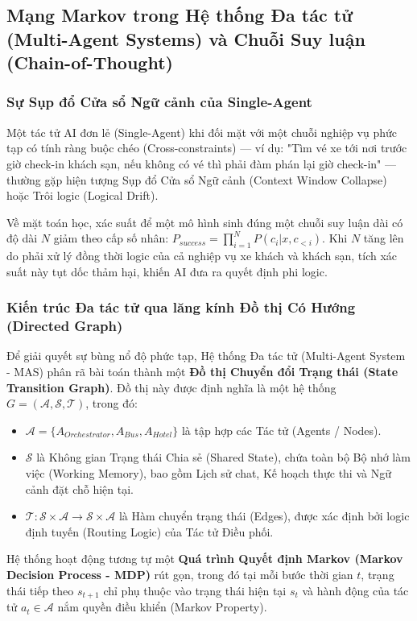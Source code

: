 \subsection{Mạng Markov trong Hệ thống Đa tác tử (Multi-Agent Systems) và Chuỗi Suy luận (Chain-of-Thought)}

\subsubsection{Sự Sụp đổ Cửa sổ Ngữ cảnh của Single-Agent}
Một tác tử AI đơn lẻ (Single-Agent) khi đối mặt với một chuỗi nghiệp vụ phức tạp có tính ràng buộc chéo (Cross-constraints) — ví dụ: "Tìm vé xe tới nơi trước giờ check-in khách sạn, nếu không có vé thì phải đàm phán lại giờ check-in" — thường gặp hiện tượng Sụp đổ Cửa sổ Ngữ cảnh (Context Window Collapse) hoặc Trôi logic (Logical Drift). 

Về mặt toán học, xác suất để một mô hình sinh đúng một chuỗi suy luận dài có độ dài $N$ giảm theo cấp số nhân: $P_{success} = \prod_{i=1}^{N} P(c_i | x, c_{<i})$. Khi $N$ tăng lên do phải xử lý đồng thời logic của cả nghiệp vụ xe khách và khách sạn, tích xác suất này tụt dốc thảm hại, khiến AI đưa ra quyết định phi logic.

\subsubsection{Kiến trúc Đa tác tử qua lăng kính Đồ thị Có Hướng (Directed Graph)}
Để giải quyết sự bùng nổ độ phức tạp, Hệ thống Đa tác tử (Multi-Agent System - MAS) phân rã bài toán thành một \textbf{Đồ thị Chuyển đổi Trạng thái (State Transition Graph)}. Đồ thị này được định nghĩa là một hệ thống $G = (\mathcal{A}, \mathcal{S}, \mathcal{T})$, trong đó:
\begin{itemize}
    \item $\mathcal{A} = \{A_{Orchestrator}, A_{Bus}, A_{Hotel}\}$ là tập hợp các Tác tử (Agents / Nodes).
    \item $\mathcal{S}$ là Không gian Trạng thái Chia sẻ (Shared State), chứa toàn bộ Bộ nhớ làm việc (Working Memory), bao gồm Lịch sử chat, Kế hoạch thực thi và Ngữ cảnh đặt chỗ hiện tại.
    \item $\mathcal{T}: \mathcal{S} \times \mathcal{A} \rightarrow \mathcal{S} \times \mathcal{A}$ là Hàm chuyển trạng thái (Edges), được xác định bởi logic định tuyến (Routing Logic) của Tác tử Điều phối.
\end{itemize}

Hệ thống hoạt động tương tự một \textbf{Quá trình Quyết định Markov (Markov Decision Process - MDP)} rút gọn, trong đó tại mỗi bước thời gian $t$, trạng thái tiếp theo $s_{t+1}$ chỉ phụ thuộc vào trạng thái hiện tại $s_t$ và hành động của tác tử $a_t \in \mathcal{A}$ nắm quyền điều khiển (Markov Property). 

